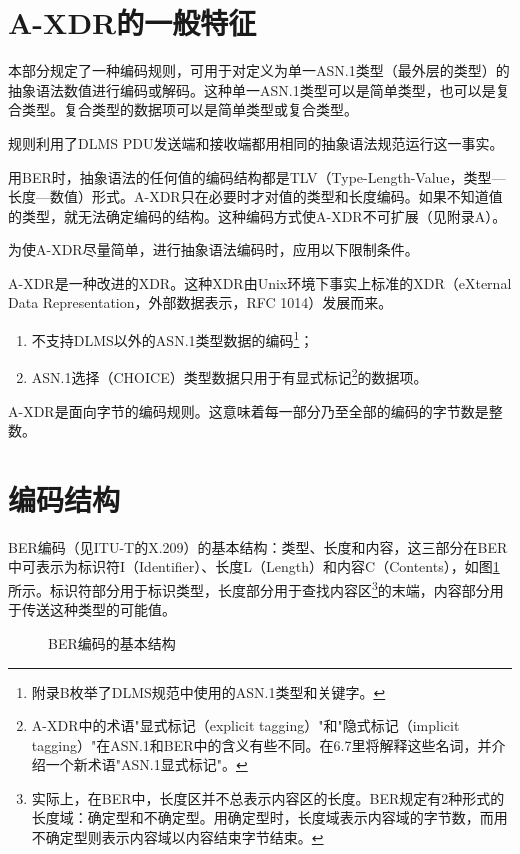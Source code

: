 \documentclass[a4paper,11pt]{ctexart}
\begin{document}
\section{A-XDR的一般特征}

本部分规定了一种编码规则，可用于对定义为单一ASN.1类型（最外层的类型）的抽象语法数值进行编码或解码。这种单一ASN.1类型可以是简单类型，也可以是复合类型。复合类型的数据项可以是简单类型或复合类型。

规则利用了DLMS PDU发送端和接收端都用相同的抽象语法规范运行这一事实。

用BER时，抽象语法的任何值的编码结构都是TLV（Type-Length-Value，类型---长度---数值）形式。A-XDR只在必要时才对值的类型和长度编码。如果不知道值的类型，就无法确定编码的结构。这种编码方式使A-XDR不可扩展（见附录A）。

为使A-XDR尽量简单，进行抽象语法编码时，应用以下限制条件。

A-XDR是一种改进的XDR。这种XDR由Unix环境下事实上标准的XDR（eXternal Data Representation，外部数据表示，RFC 1014）发展而来。

\begin{enumerate}[label=\alph*)]
\item 不支持DLMS以外的ASN.1类型数据的编码\footnote{附录B枚举了DLMS规范中使用的ASN.1类型和关键字。}；
\item ASN.1选择（CHOICE）类型数据只用于有显式标记\footnote{A-XDR中的术语"显式标记（explicit tagging）"和"隐式标记（implicit tagging）"在ASN.1和BER中的含义有些不同。在6.7里将解释这些名词，并介绍一个新术语"ASN.1显式标记"。}的数据项。
\end{enumerate}

A-XDR是面向字节的编码规则。这意味着每一部分乃至全部的编码的字节数是整数。

\section{编码结构}

BER编码（见ITU-T的X.209）的基本结构：类型、长度和内容，这三部分在BER中可表示为标识符I（Identifier）、长度L（Length）和内容C（Contents），如图\ref{fig:ber}所示。标识符部分用于标识类型，长度部分用于查找内容区\footnote{实际上，在BER中，长度区并不总表示内容区的长度。BER规定有2种形式的长度域：确定型和不确定型。用确定型时，长度域表示内容域的字节数，而用不确定型则表示内容域以内容结束字节结束。}的末端，内容部分用于传送这种类型的可能值。

\begin{figure}[htbp]
\centering
{}
\caption{BER编码的基本结构}\label{fig:ber}
\end{figure}
\end{document}
